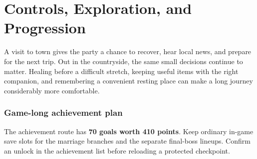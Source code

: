 \chapter{Controls, Exploration, and Progression}
\label{written-exploration}

A visit to town gives the party a chance to recover, hear local news, and
prepare for the next trip. Out in the countryside, the same small decisions
continue to matter. Healing before a difficult stretch, keeping useful
items with the right companion, and remembering a convenient resting place
can make a long journey considerably more comfortable.

\subsection*{Game-long achievement plan}

The achievement route has \textbf{70 goals worth 410 points}.
Keep ordinary in-game save slots for the marriage branches and the
separate final-boss lineups. Confirm an unlock in the achievement list
before reloading a protected checkpoint.

